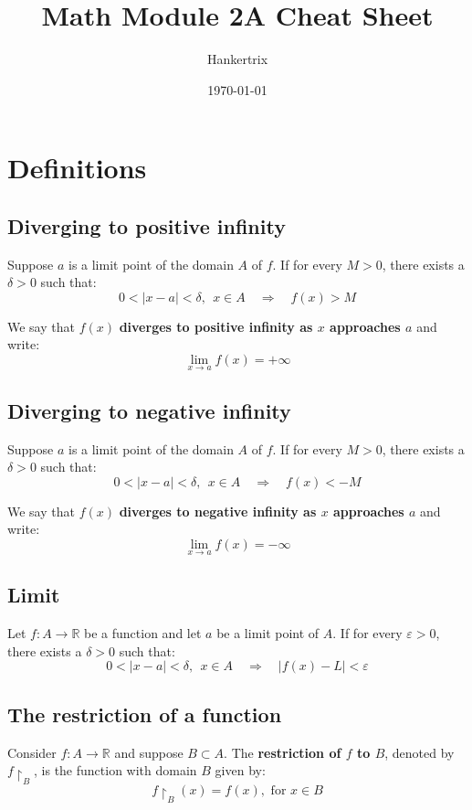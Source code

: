 \documentclass[11pt]{article}
\author{Hankertrix}
\date{\today}
\title{Math Module 2A Cheat Sheet}
\begin{document}
\maketitle
\setcounter{tocdepth}{2}
\tableofcontents

\newpage

\section{Definitions}
\label{sec:orgbd9b3b8}

\subsection{Diverging to positive infinity}
\label{sec:orga078353}
Suppose \(a\) is a limit point of the domain \(A\) of \(f\). If for every \(M > 0\), there exists a \(\delta > 0\) such that:
\[0 < |x - a| < \delta, \ \ x \in A \quad \Rightarrow \quad f(x) > M\]

We say that \(f(x)\) \textbf{diverges to positive infinity as \(x\) approaches \(a\)} and write:
\[\lim_{x \rightarrow a} f(x) = + \infty\]

\subsection{Diverging to negative infinity}
\label{sec:org511a249}
Suppose \(a\) is a limit point of the domain \(A\) of \(f\). If for every \(M > 0\), there exists a \(\delta > 0\) such that:
\[0 < |x - a| < \delta, \ \ x \in A \quad \Rightarrow \quad f(x) < -M\]

We say that \(f(x)\) \textbf{diverges to negative infinity as \(x\) approaches \(a\)} and write:
\[\lim_{x \rightarrow a} f(x) = - \infty\]

\subsection{Limit}
\label{sec:org94f9ee0}
Let \(f : A \rightarrow \mathbb{R}\) be a function and let \(a\) be a limit point of \(A\). If for every \(\varepsilon > 0\), there exists a \(\delta > 0\) such that:
\[0 < |x - a| < \delta, \ \ x \in A \quad \Rightarrow \quad |f(x) - L| < \varepsilon\]

\subsection{The restriction of a function}
\label{sec:org270b871}
Consider \(f : A \rightarrow \mathbb{R}\) and suppose \(B \subset A\). The \textbf{restriction of \(f\) to \(B\)}, denoted by \(f \restriction_B\), is the function with domain \(B\) given by:
\[f \restriction_B (x) = f(x), \text{ for } x \in B\]
\end{document}
